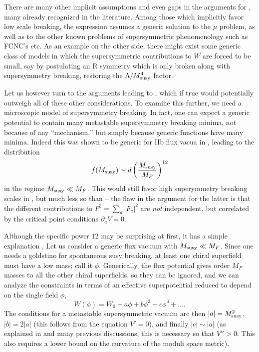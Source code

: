 \documentclass[aps,amsfonts]{ar2e}
\begin{document}
There are many other implicit assumptions and even gaps in the
arguments for , many already recognized in the
literature.  Among those which implicitly favor low scale breaking,
the expression  assumes a generic solution to the $\mu$
problem, as well as to the other known problems of supersymmetric
phenomenology such as FCNC's etc.  As an example on the other side,
there might exist some generic class of models in which the
supersymmetric contributions to $W$ are forced to be small, say
by postulating an R symmetry which is only broken along with
supersymmetry breaking, restoring the $\Lambda/M_{\rm susy}^4$ factor.

Let us however turn to the arguments leading to , which
if true would potentially outweigh all of these other considerations.
To examine this further, we need a microscopic model of supersymmetry
breaking.  In fact, one can expect a generic potential to contain
many metastable supersymmetry breaking minima,
not because of any ``mechanism,'' but simply because generic
functions have many minima.  Indeed this was shown to be generic for
IIb flux vacua in \cite{Denef:2004cf}, leading to the distribution
\begin{equation}\label{eq:branchone}
f(M_{\rm susy}) \sim d \left( \frac{M_{\rm susy}}{M_{F}}
\right)^{12}
\end{equation}
in the regime $M_{\rm susy} \ll M_F$. This would still favor high
superymmetry breaking scales in ,
but much less so than  -- the flaw in the argument for
the latter is that the different
contributions to $F^2=\sum_a |F_a|^2$ are \emph{not} independent,
but correlated by the critical point conditions $\partial_a V=0$.

Although the specific power $12$ may be surprising at first, it has
a simple explanation \cite{Dine:2005yq,Giudice:2006sn}. Let us
consider a generic flux vacuum with $M_{\rm susy} \ll M_{F}$. Since
one needs a goldstino for spontaneous susy breaking, at least one
chiral superfield must have a low mass; call it $\phi$. Generically,
the flux potential gives order $M_{F}$ masses to all the other
chiral superfields, so they can be ignored, and we can analyze the
constraints in terms of an effective superpotential reduced to
depend on the single field $\phi$,
\begin{equation}
W(\phi) = W_0 + a \phi + b \phi^2 + c \phi^3 + \ldots .
\end{equation}
The conditions for a metastable supersymmetric vacuum are then
$|a| = M_{\rm susy}^2$, $|b| = 2 |a|$ (this follows
from the equation $V'=0$), and finally $|c| \sim |a|$ (as explained
in \cite{Denef:2004cf} and many previous discussions, this is
necessary so that $V''>0$. This also requires a lower bound on the
curvature of the moduli space metric).
\end{document}
